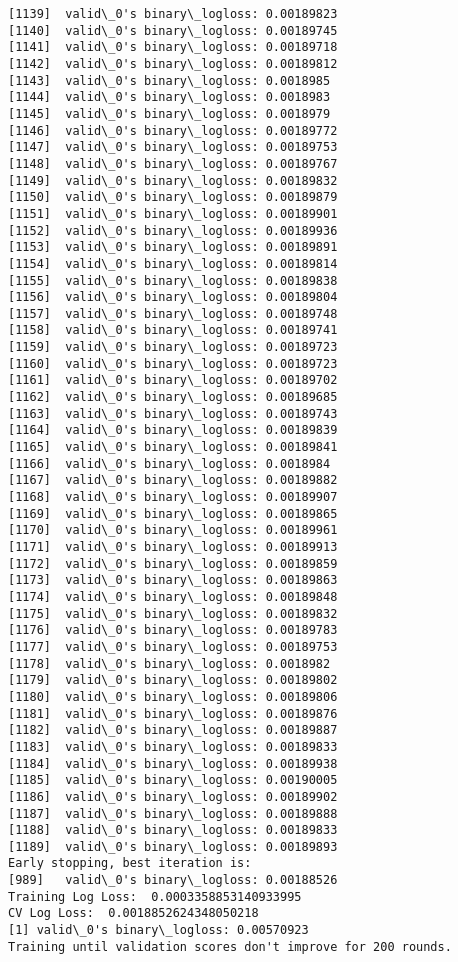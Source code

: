 \documentclass[11pt]{article}
\begin{document}
\begin{Verbatim}[commandchars=\\\{\}]
[1139]	valid\_0's binary\_logloss: 0.00189823
[1140]	valid\_0's binary\_logloss: 0.00189745
[1141]	valid\_0's binary\_logloss: 0.00189718
[1142]	valid\_0's binary\_logloss: 0.00189812
[1143]	valid\_0's binary\_logloss: 0.0018985
[1144]	valid\_0's binary\_logloss: 0.0018983
[1145]	valid\_0's binary\_logloss: 0.0018979
[1146]	valid\_0's binary\_logloss: 0.00189772
[1147]	valid\_0's binary\_logloss: 0.00189753
[1148]	valid\_0's binary\_logloss: 0.00189767
[1149]	valid\_0's binary\_logloss: 0.00189832
[1150]	valid\_0's binary\_logloss: 0.00189879
[1151]	valid\_0's binary\_logloss: 0.00189901
[1152]	valid\_0's binary\_logloss: 0.00189936
[1153]	valid\_0's binary\_logloss: 0.00189891
[1154]	valid\_0's binary\_logloss: 0.00189814
[1155]	valid\_0's binary\_logloss: 0.00189838
[1156]	valid\_0's binary\_logloss: 0.00189804
[1157]	valid\_0's binary\_logloss: 0.00189748
[1158]	valid\_0's binary\_logloss: 0.00189741
[1159]	valid\_0's binary\_logloss: 0.00189723
[1160]	valid\_0's binary\_logloss: 0.00189723
[1161]	valid\_0's binary\_logloss: 0.00189702
[1162]	valid\_0's binary\_logloss: 0.00189685
[1163]	valid\_0's binary\_logloss: 0.00189743
[1164]	valid\_0's binary\_logloss: 0.00189839
[1165]	valid\_0's binary\_logloss: 0.00189841
[1166]	valid\_0's binary\_logloss: 0.0018984
[1167]	valid\_0's binary\_logloss: 0.00189882
[1168]	valid\_0's binary\_logloss: 0.00189907
[1169]	valid\_0's binary\_logloss: 0.00189865
[1170]	valid\_0's binary\_logloss: 0.00189961
[1171]	valid\_0's binary\_logloss: 0.00189913
[1172]	valid\_0's binary\_logloss: 0.00189859
[1173]	valid\_0's binary\_logloss: 0.00189863
[1174]	valid\_0's binary\_logloss: 0.00189848
[1175]	valid\_0's binary\_logloss: 0.00189832
[1176]	valid\_0's binary\_logloss: 0.00189783
[1177]	valid\_0's binary\_logloss: 0.00189753
[1178]	valid\_0's binary\_logloss: 0.0018982
[1179]	valid\_0's binary\_logloss: 0.00189802
[1180]	valid\_0's binary\_logloss: 0.00189806
[1181]	valid\_0's binary\_logloss: 0.00189876
[1182]	valid\_0's binary\_logloss: 0.00189887
[1183]	valid\_0's binary\_logloss: 0.00189833
[1184]	valid\_0's binary\_logloss: 0.00189938
[1185]	valid\_0's binary\_logloss: 0.00190005
[1186]	valid\_0's binary\_logloss: 0.00189902
[1187]	valid\_0's binary\_logloss: 0.00189888
[1188]	valid\_0's binary\_logloss: 0.00189833
[1189]	valid\_0's binary\_logloss: 0.00189893
Early stopping, best iteration is:
[989]	valid\_0's binary\_logloss: 0.00188526
Training Log Loss:  0.0003358853140933995
CV Log Loss:  0.0018852624348050218
[1]	valid\_0's binary\_logloss: 0.00570923
Training until validation scores don't improve for 200 rounds.

\end{Verbatim}
\end{document}
